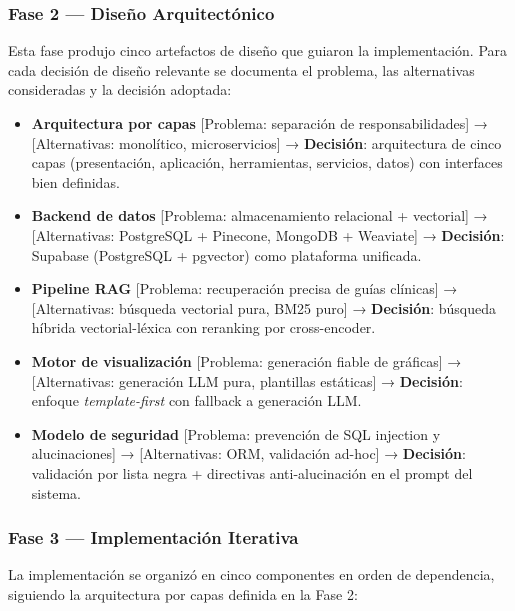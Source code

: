 \subsubsection{Fase 2 — Diseño Arquitectónico}

Esta fase produjo cinco artefactos de diseño que guiaron la implementación. Para cada decisión de diseño relevante se documenta el problema, las alternativas consideradas y la decisión adoptada:

\begin{itemize}[nosep, leftmargin=*]
  \item \textbf{Arquitectura por capas} [Problema: separación de responsabilidades] → [Alternativas: monolítico, microservicios] → \textbf{Decisión}: arquitectura de cinco capas (presentación, aplicación, herramientas, servicios, datos) con interfaces bien definidas.
  \item \textbf{Backend de datos} [Problema: almacenamiento relacional + vectorial] → [Alternativas: PostgreSQL + Pinecone, MongoDB + Weaviate] → \textbf{Decisión}: Supabase (PostgreSQL + pgvector) como plataforma unificada.
  \item \textbf{Pipeline RAG} [Problema: recuperación precisa de guías clínicas] → [Alternativas: búsqueda vectorial pura, BM25 puro] → \textbf{Decisión}: búsqueda híbrida vectorial-léxica con reranking por cross-encoder.
  \item \textbf{Motor de visualización} [Problema: generación fiable de gráficas] → [Alternativas: generación LLM pura, plantillas estáticas] → \textbf{Decisión}: enfoque \textit{template-first} con fallback a generación LLM.
  \item \textbf{Modelo de seguridad} [Problema: prevención de SQL injection y alucinaciones] → [Alternativas: ORM, validación ad-hoc] → \textbf{Decisión}: validación por lista negra + directivas anti-alucinación en el prompt del sistema.
\end{itemize}

\subsubsection{Fase 3 — Implementación Iterativa}

La implementación se organizó en cinco componentes en orden de dependencia, siguiendo la arquitectura por capas definida en la Fase 2:

